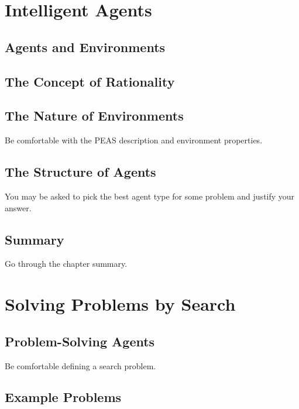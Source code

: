 \documentclass[exam={Midterm}]{cs581exam}
\begin{document}
\section{Intelligent Agents}\label{sec:intelligent-agents}
\subsection{Agents and Environments}\label{subsec:2.1}
\subsection{The Concept of Rationality}\label{subsec:2.2}
\subsection{The Nature of Environments}\label{subsec:2.3}
Be comfortable with the PEAS description and environment properties.
\subsection{The Structure of Agents}\label{subsec:2.4}
You may be asked to pick the best agent type for some problem and justify
your answer.
\subsection{Summary}\label{subsec:2-summary}
Go through the chapter summary.

\section{Solving Problems by Search}\label{sec:solving-problems-by-search}
\subsection{Problem-Solving Agents}\label{subsec:3.1}
Be comfortable defining a search problem.
\subsection{Example Problems}\label{subsec:3.2}
\end{document}
